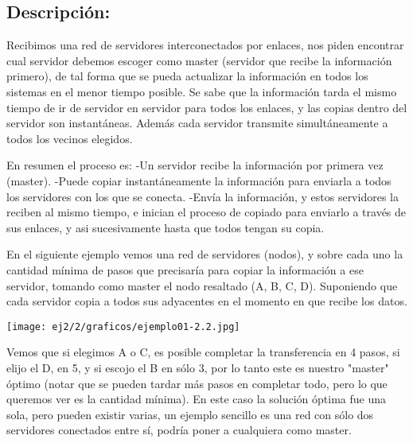\subsection{Descripción:}

Recibimos una red de servidores interconectados por enlaces, nos piden encontrar cual servidor debemos escoger como master (servidor que recibe la información primero), de tal forma que se pueda actualizar la información en todos los sistemas en el menor tiempo posible.
Se sabe que la información tarda el mismo tiempo de ir de servidor en servidor para todos los enlaces, y las copias dentro del servidor son instantáneas.
Además cada servidor transmite simultáneamente a todos los vecinos elegidos.

En resumen el proceso es:
-Un servidor recibe la información por primera vez (master).
-Puede copiar instantáneamente la información para enviarla a todos los servidores con los que se conecta.
-Envía la información, y estos servidores la reciben al mismo tiempo, e inician el proceso de copiado para enviarlo a través de sus enlaces, y asi sucesivamente hasta que todos tengan su copia.

En el siguiente ejemplo vemos una red de servidores (nodos), y sobre cada uno la cantidad mínima de pasos que precisaría para copiar la información a ese servidor, tomando como master el nodo resaltado (A, B, C, D). Suponiendo que cada servidor copia a todos sus adyacentes en el momento en que recibe los datos.

\texttt{[image: ej2/2/graficos/ejemplo01-2.2.jpg]} 

Vemos que si elegimos A o C, es posible completar la transferencia en 4 pasos, si elijo el D, en 5, y si escojo el B en sólo 3, por lo tanto este es nuestro "master" óptimo (notar que se pueden tardar más pasos en completar todo, pero lo que queremos ver es la cantidad mínima).
En este caso la solución óptima fue una sola, pero pueden existir varias, un ejemplo sencillo es una red con sólo dos servidores conectados entre sí, podría poner a cualquiera como master.

